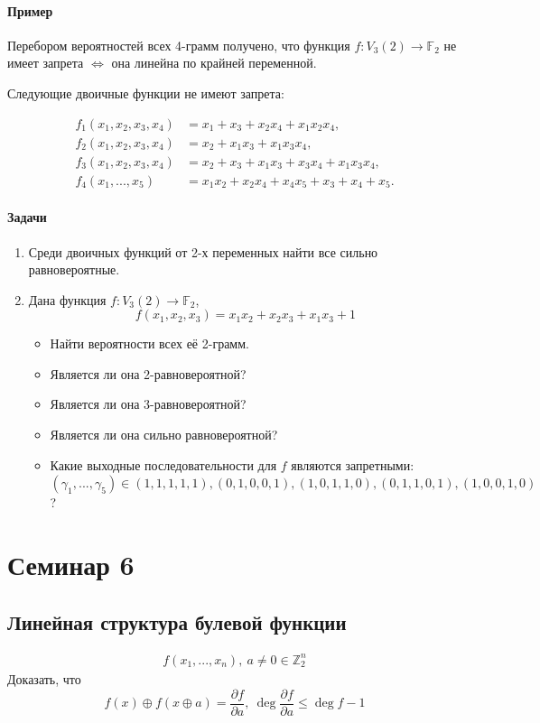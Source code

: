 \documentclass[a4paper,12pt]{article}
\newcommand{\seminary}[1]{\pagebreak\section*{#1}
	\addcontentsline{toc}{section}{#1}
}
\newcommand{\xor}{\oplus}
\newcommand{\partialfrac}[2]{\frac{\partial #1}{\partial #2}}
\newcommand{\ZZ}{\mathbb{Z}}
\begin{document}
	\paragraph{Пример}
	Перебором вероятностей всех 4-грамм получено, что функция $f: V_3(2) \rightarrow \mathbb{F}_2$ не имеет запрета $\Leftrightarrow$ она линейна по крайней переменной.

	Следующие двоичные функции не имеют запрета:

	$$
	\begin{aligned}
		f_1(x_1, x_2, x_3, x_4) &= x_1 + x_3 + x_2x_4 + x_1x_2x_4,\\
		f_2(x_1, x_2, x_3, x_4) &= x_2 + x_1x_3 + x_1x_3x_4,\\
		f_3(x_1, x_2, x_3, x_4) &= x_2 + x_3 + x_1x_3 + x_3x_4 + x_1x_3x_4, \\
		f_4(x_1, ..., x_5) &= x_1x_2 + x_2x_4 + x_4x_5 + x_3 + x_4 + x_5.
	\end{aligned}
	$$

	\paragraph{Задачи}
	\begin{enumerate}
		\item Среди двоичных функций от 2-х переменных найти все сильно равновероятные.
		\item Дана функция $f: V_3(2) \rightarrow \mathbb{F}_2$, \[ f(x_1, x_2, x_3) = x_1x_2 + x_2x_3 + x_1x_3 + 1 \]
		\begin{itemize}
			\item Найти вероятности всех её 2-грамм.
			\item Является ли она 2-равновероятной?
			\item Является ли она 3-равновероятной?
			\item Является ли она сильно равновероятной?
			\item Какие выходные последовательности для $f$ являются запретными: $(\gamma_1, ..., \gamma_5) \in {(1,1,1,1,1), (0,1,0,0,1), (1,0,1,1,0), (0,1,1,0,1), (1,0,0,1,0)}$ ?
		\end{itemize}
	\end{enumerate}

	
	\seminary{Семинар 6}
	\subsection{Линейная структура булевой функции}
	$$
	\begin{aligned}
		f(x_1, ..., x_n), ~ a \not = 0 \in \ZZ_2^n
	\end{aligned}
	$$
	Доказать, что
	$$
	f(x) \xor f(x \xor a) = \partialfrac{f}{a}, ~ \deg \partialfrac{f}{a} \le \deg f -1
	$$
	
\end{document}
